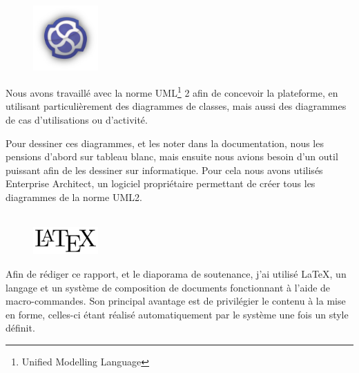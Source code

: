 \begin{figure}
	\includegraphics[width=2.5cm]{contents/images/logoEnterpriseArchitect.png}
\end{figure}
Nous avons travaillé avec la norme UML\footnote{Unified Modelling Language} 2 afin de concevoir la plateforme, en utilisant particulièrement des diagrammes de classes, mais aussi des diagrammes de cas d'utilisations ou d'activité. 

Pour dessiner ces diagrammes, et les noter dans la documentation, nous les pensions d'abord sur tableau blanc, mais ensuite nous avions besoin d'un outil puissant afin de les dessiner sur informatique. Pour cela nous avons utilisés Enterprise Architect, un logiciel propriétaire permettant de créer tous les diagrammes de la norme UML2.\\~

\begin{figure}
	\includegraphics[width=2.5cm]{contents/images/logoLatex.png}
\end{figure}
Afin de rédiger ce rapport, et le diaporama de soutenance, j'ai utilisé \LaTeX{}, un langage et un système de composition de documents fonctionnant à l'aide de macro-commandes. Son principal avantage est de privilégier le contenu à la mise en forme, celles-ci étant réalisé automatiquement par le système une fois un style définit. 